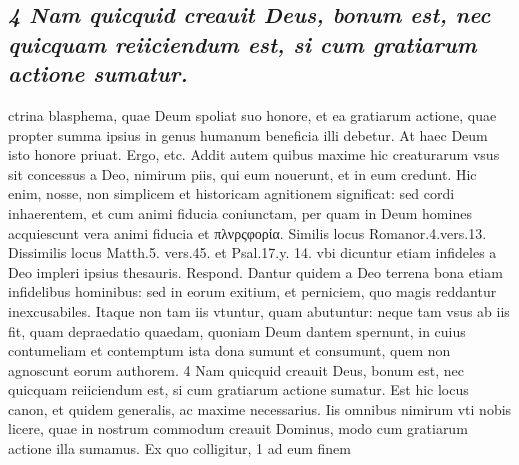 \documentclass{article}
\begin{document}
\begin{pages}
\subsection*{\textit{4 Nam quicquid creauit Deus, bonum est, nec quicquam reiiciendum est, si cum gratiarum actione sumatur.}}ctrina blasphema, quae Deum spoliat suo honore, et ea gratiarum actione, quae propter summa ipsius in genus humanum beneficia illi debetur. At haec Deum isto honore priuat. Ergo, etc. Addit autem quibus maxime hic creaturarum vsus sit concessus a Deo, nimirum piis, qui eum nouerunt, et in eum credunt. Hic enim, nosse, non simplicem et historicam agnitionem significat: sed cordi inhaerentem, et cum animi fiducia coniunctam, per quam in Deum homines acquiescunt vera animi fiducia et πλνρςφορία. Similis locus Romanor.4.vers.13. Dissimilis locus Matth.5. vers.45. et Psal.17.y. 14. vbi dicuntur etiam infideles a Deo impleri ipsius thesauris. Respond. Dantur quidem a Deo terrena bona etiam infidelibus hominibus: sed in eorum exitium, et perniciem, quo magis reddantur inexcusabiles. Itaque non tam iis vtuntur, quam abutuntur: neque tam vsus ab iis fit, quam depraedatio quaedam, quoniam Deum dantem spernunt, in cuius contumeliam et contemptum ista dona sumunt et consumunt, quem non agnoscunt eorum authorem. 4 Nam quicquid creauit Deus, bonum est, nec quicquam reiiciendum est, si cum gratiarum actione sumatur. Est hic locus canon, et quidem generalis, ac maxime necessarius. Iis omnibus nimirum vti nobis licere, quae in nostrum commodum creauit Dominus, modo cum gratiarum actione illa sumamus. Ex quo colligitur, 1 ad eum finem  \pend

\end{pages}
\end{document}
